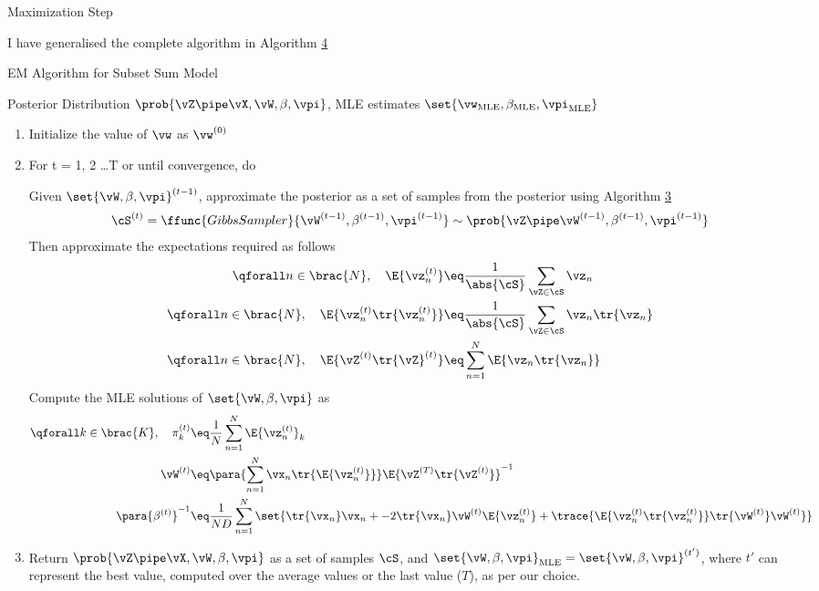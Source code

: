 \documentclass{article}
\begin{document}
\begin{question}
\begin{qsubsection}{Maximization Step}
	\end{qsubsection}

	I have generalised the complete algorithm in Algorithm \hyperlink{algo:4}{4}

	\begin{algo}[0.9\textwidth]{EM Algorithm for Subset Sum Model}

		 Posterior Distribution $\prob{\vZ \pipe \vX, \vW, \beta, \vpi}$, MLE estimates $\set{\vw_{\text{MLE}}, \beta_{\text{MLE}}, \vpi_{\text{MLE}}}$ \sbr


		\begin{enumerate}
			\item Initialize the value of $\vw$ as $\vw^{(0)}$
			\item For t = 1, 2 \dots T or until convergence, do
				\begin{enumerate}
					\ditem[E Step:]
					Given $\set{\vW, \beta, \vpi}^{(t - 1)}$, approximate the posterior as a set of samples from the posterior using Algorithm \hyperlink{algo:3}{3} \ie
						\begin{align*}
							\cS^{(t)} = \ffunc{GibbsSampler}{\vW^{(t - 1)}, \beta^{(t - 1)}, \vpi^{(t - 1)}} \sim \prob{\vZ \pipe \vW^{(t - 1)}, \beta^{(t - 1)}, \vpi^{(t - 1)}}
						\end{align*}
						Then approximate the expectations required as follows
						\begin{align*}
							\qforall n \in \brac{N}, \quad \E{\vz_n^{(t)}}			&\eq	\frac{1}{\abs{\cS}} \sum_{\vZ \in \cS} \vz_n \\
							\qforall n \in \brac{N}, \quad \E{\vz_n^{(t)} \tr{\vz_n^{(t)}}}	&\eq	\frac{1}{\abs{\cS}} \sum_{\vZ \in \cS} \vz_n \tr{\vz_n} \\
							\qforall n \in \brac{N}, \quad \E{\vZ^{(t)} \tr{\vZ}^{(t)}}		&\eq	\sum_{n = 1}^N \E{\vz_n \tr{\vz_n}}
						\end{align*}
					\ditem[M Step:]
						Compute the MLE solutions of $\set{\vW, \beta, \vpi}$ as
						\begin{align*}
							\qforall k \in \brac{K}, \quad \pi_k^{(t)}	&\eq	\frac{1}{N} \sum_{n = 1}^N \E{\vz_n^{(t)}}_k \\
							\vW^{(t)}									&\eq	\para{\sum_{n = 1}^N \vx_n \tr{\E{\vz_n^{(t)}}}} \E{\vZ^{(T)} \tr{\vZ^{(t)}}}^{-1} \\
							\para{\beta^{(t)}}^{-1}						&\eq	\frac{1}{N D} \sum_{n = 1}^N \set{\tr{\vx_n} \vx_n + - 2 \tr{\vx_n} \vW^{(t)} \E{\vz_n^{(t)}} + \trace{\E{\vz_n^{(t)} \tr{\vz_n^{(t)}}} \tr{\vW^{(t)}} \vW^{(t)}}}
						\end{align*}
				\end{enumerate}
			\item Return $\prob{\vZ \pipe \vX, \vW, \beta, \vpi}$ as a set of samples $\cS$, and $\set{\vW, \beta, \vpi}_{\text{MLE}} = \set{\vW, \beta, \vpi}^{(t')}$, where $t'$ can represent the best value, computed over the average values or the last value ($T$), as per our choice.
		\end{enumerate}


\end{algo}
\end{question}
\end{document}
